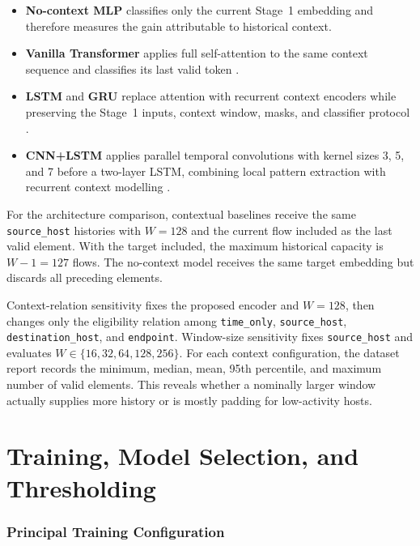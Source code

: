 \begin{itemize}[leftmargin=*]
    \item \textbf{No-context MLP} classifies only the current Stage~1
    embedding and therefore measures the gain attributable to historical
    context.

    \item \textbf{Vanilla Transformer} applies full self-attention to the same
    context sequence and classifies its last valid token
    \cite{Vaswani2017}.

    \item \textbf{LSTM} and \textbf{GRU} replace attention with recurrent
    context encoders while preserving the Stage~1 inputs, context window,
    masks, and classifier protocol \cite{Hochreiter1997LSTM,Cho2014GRU}.

    \item \textbf{CNN+LSTM} applies parallel temporal convolutions with kernel
    sizes 3, 5, and 7 before a two-layer LSTM, combining local pattern
    extraction with recurrent context modelling
    \cite{Kim2014CNN,Hochreiter1997LSTM}.
\end{itemize}

For the architecture comparison, contextual baselines receive the same
\texttt{source\_host} histories with $W=128$ and the current flow included as
the last valid element. With the target included, the maximum historical
capacity is $W-1=127$ flows. The no-context model receives the same target
embedding but discards all preceding elements.

Context-relation sensitivity fixes the proposed encoder and $W=128$, then
changes only the eligibility relation among \texttt{time\_only},
\texttt{source\_host}, \texttt{destination\_host}, and \texttt{endpoint}.
Window-size sensitivity fixes \texttt{source\_host} and evaluates
$W\in\{16,32,64,128,256\}$. For each context configuration, the dataset report
records the minimum, median, mean, 95th percentile, and maximum number of valid
elements. This reveals whether a nominally larger window actually supplies
more history or is mostly padding for low-activity hosts.

\section{Training, Model Selection, and Thresholding}
\label{subsec:experimental_training_protocol}

\subsubsection{Principal Training Configuration}
\label{subsubsec:principal_training_config}

